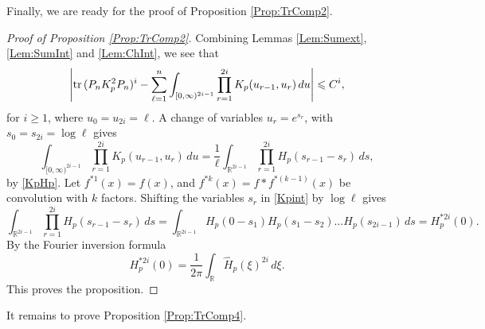 \documentclass{article}
\numberwithin{equation}{section}
\numberwithin{figure}{section}
\theoremstyle{plain}
\theoremstyle{plain}
\numberwithin{thm}{section}
\theoremstyle{remark}
\newcommand{\Tr}{\text{{\rm tr\,}}}
\newcommand{\R}{\mathbb{R}}
\let \le \leqslant
\let \ge \geqslant
\begin{document}
Finally, we are ready for the proof of Proposition \ref{Prop:TrComp2}.

\begin{proof}[Proof of Proposition \ref{Prop:TrComp2}]
Combining Lemmas \ref{Lem:Sumext}, \ref{Lem:SumInt} and \ref{Lem:ChInt}, we see that
\begin{equation*}
\left|\Tr(P_nK_p^2P_n)^i-\sum_{\ell=1}^n\int_{[0,\infty)^{2i-1}}\prod_{r=1}^{2i}K_p(u_{r-1},u_r)\,du\right|\le C^i,
\end{equation*}
for $i\ge 1$, where $u_0=u_{2i}=\ell$. A change of variables $u_r=e^{s_r}$, with $s_0=s_{2i}=\log\ell$ gives
\begin{equation}\label{Kpint}
\int_{[0,\infty)^{2i-1}}\prod_{r=1}^{2i}K_p(u_{r-1},u_r)\,du=\frac 1\ell \int_{\R^{2i-1}}\prod_{r=1}^{2i} H_p(s_{r-1}-s_r)\,ds,
\end{equation}
by \eqref{KpHp}. Let $f^{*1}(x)=f(x)$, and $f^{*k}(x)=f*f^{*(k-1)}(x)$ be convolution with $k$ factors. Shifting the variables $s_r$ in \eqref{Kpint} by $\log\ell$ gives
\begin{equation*}
\int_{\R^{2i-1}}\prod_{r=1}^{2i}H_p(s_{r-1}-s_r)\,ds=\int_{\R^{2i-1}}H_p(0-s_1)H_p(s_1-s_2)\dots H_p(s_{2i-1})\,ds=H_p^{*2i}(0).
\end{equation*}
By the Fourier inversion formula
\begin{equation*}
H_p^{*2i}(0)=\frac 1{2\pi}\int_{\R}\hat{H}_p(\xi)^{2i}\,d\xi.
\end{equation*}
This proves the proposition.

\end{proof}

It remains to prove Proposition \ref{Prop:TrComp4}.
\end{document}
